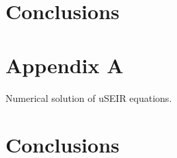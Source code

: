\documentclass[a4paper,oneside,11pt]{article}
\begin{document}
\section{Conclusions}

\section*{Appendix A}

Numerical solution of uSEIR equations.








\section{Conclusions}
\end{document}
